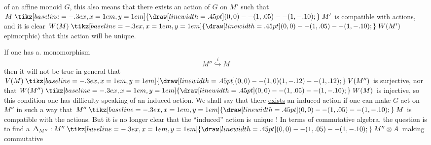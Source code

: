 of an affine monoid $G$, this also means that there exists an action of $G$ on $M'$  such that $M\mathrel{\tikz[baseline=-.3ex,x=1em,y=1em]{\draw[line width=.45pt] (0,0)--(1,.05)--(1,-.10);}}M'$ is compatible with  actions, and it is clear  $W(M)\mathrel{\tikz[baseline=-.3ex,x=1em,y=1em]{\draw[line width=.45pt] (0,0)--(1,.05)--(1,-.10);}}W(M')$ epimorphic) that this action will be unique.

If one has a. monomorphism
\[
M''\overset{i}{\hookrightarrow}M
\]
then it will not be true in general that $V(M)\mathrel{\tikz[baseline=-.3ex,x=1em,y=1em]{\draw[line width=.45pt] (0,0)--(1,0) (1,-.12)--(1,.12);}}V(M'')$ is surjective, nor that $W(M'')\mathrel{\tikz[baseline=-.3ex,x=1em,y=1em]{\draw[line width=.45pt] (0,0)--(1,.05)--(1,-.10);}}W(M)$ is injective, so  this condition one has difficulty speaking of an induced action.
 We shall say that there \uline{exists} an induced action if one can make $G$ act on $M''$ in such a way that $M''\mathrel{\tikz[baseline=-.3ex,x=1em,y=1em]{\draw[line width=.45pt] (0,0)--(1,.05)--(1,-.10);}}M$ is compatible with the actions.
But it is no longer clear that the ``induced'' action is unique ! In terms of commutative algebra, the question is to find a $\Delta_{M''}:M''\mathrel{\tikz[baseline=-.3ex,x=1em,y=1em]{\draw[line width=.45pt] (0,0)--(1,.05)--(1,-.10);}}M''\otimes A$ making commutative

